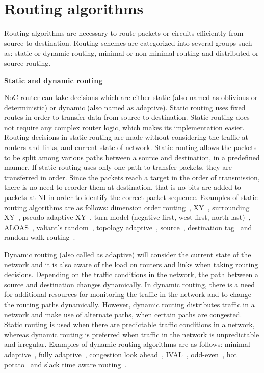 \section{Routing algorithms}
Routing algorithms are necessary to route packets or circuits efficiently from source to destination. Routing schemes are categorized into several groups such as: static or dynamic routing, minimal or non-minimal routing and distributed or source routing.

\vspace{0.5cm}
\noindent\textbf{Static and dynamic routing}
\vspace{5mm}

\noindent NoC router can take decisions which are either static (also named as oblivious or deterministic) or dynamic (also named as adaptive). Static routing uses fixed routes in order to transfer data from source to destination. Static routing does not require any complex router logic, which makes its implementation easier. Routing decisions in static routing are made without considering the traffic at routers and links, and current state of network. Static routing allows the packets to be split among various paths between a source and destination, in a predefined manner. If static routing uses only one path to transfer packets, they are transferred in order. Since the packets reach a target in the order of transmission, there is no need to reorder them at destination, that is no bits are added to packets at NI in order to identify the correct packet sequence. Examples of static routing algorithms are as follows: dimension order routing~\cite{Dally}, XY~\cite{Dehyadgari}, surrounding XY~\cite{Bobda}, pseudo-adaptive XY~\cite{Dehyadgari}, turn model (negative-first, west-first, north-last)~\cite{Kariniemi}, ALOAS~\cite{Kim}, valiant's random~\cite{Dally}, topology adaptive~\cite{Bartic}, source~\cite{Dally2001}, destination tag~\cite{Dally} and random walk routing~\cite{Pirretti}.

Dynamic routing (also called as adaptive) will consider the current state of the network and it is also aware of the load on routers and links when taking routing decisions. Depending on the traffic conditions in the network, the path between a source and destination changes dynamically. In dynamic routing, there is a need for additional resources for monitoring the traffic in the network and to change the routing paths dynamically. However, dynamic routing distributes traffic in a network and make use of alternate paths, when certain paths are congested. Static routing is used when there are predictable traffic conditions in a network, whereas dynamic routing is preferred when traffic in the network is unpredictable and irregular. Examples of dynamic routing algorithms are as follows: minimal adaptive~\cite{Dally}, fully adaptive~\cite{Dally}, congestion look ahead~\cite{Kim2005}, IVAL~\cite{Kariniemi}, odd-even~\cite{Hu}, hot potato~\cite{Feige} and slack time aware routing~\cite{Andreasson}.

